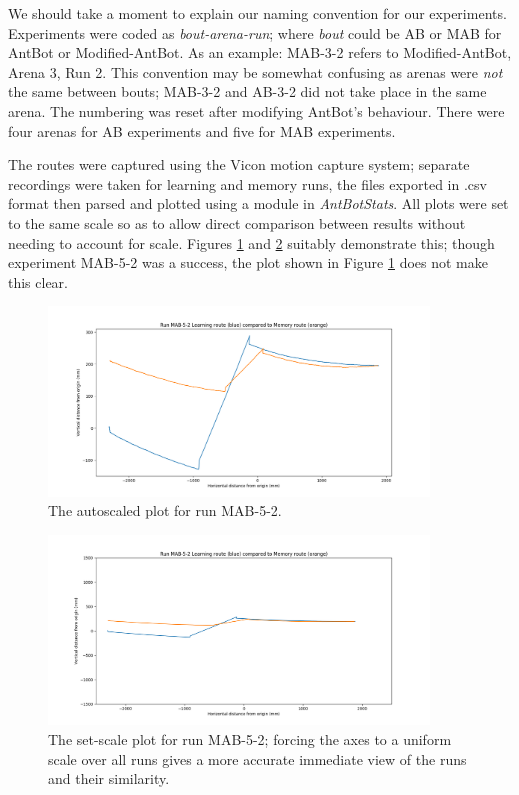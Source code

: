 \documentclass[a4paper,11pt,twoside,openright]{article}
\begin{document}
We should take a moment to explain our naming convention for our experiments. Experiments were coded as \textit{bout-arena-run}; where \textit{bout} could be
AB or MAB for AntBot or Modified-AntBot. As an example: MAB-3-2 refers to Modified-AntBot, Arena 3, Run 2. This convention may
be somewhat confusing as arenas were \textit{not} the same between bouts; MAB-3-2 and AB-3-2 did not take place in the same arena. The
numbering was reset after modifying AntBot's behaviour. There were four arenas for AB experiments and five for MAB experiments.
\newline

The routes were captured using the Vicon motion capture system; separate recordings were taken for learning and memory runs, the
files exported in .csv format then parsed and plotted using a module in \textit{AntBotStats}. All plots were set to the same scale
so as to allow direct comparison between results without needing to account for scale. Figures \ref{fig:autoscalerun} and \ref{fig:setscalerun}
suitably demonstrate this; though experiment MAB-5-2 was a success, the plot shown in Figure \ref{fig:autoscalerun} does not make this clear.

\begin{figure}
  \centering
  \includegraphics[width=0.9\textwidth]{MAB-5-2}
  \caption{
   \label{fig:autoscalerun}The autoscaled plot for run MAB-5-2.
  }
\end{figure}

\begin{figure}
  \centering
  \includegraphics[width=0.9\textwidth]{MAB-5-2-S}
  \caption{\label{fig:setscalerun}The set-scale plot for run MAB-5-2; forcing the axes to a uniform scale over all runs gives a more accurate immediate
      view of the runs and their similarity.}
\end{figure}
\end{document}
